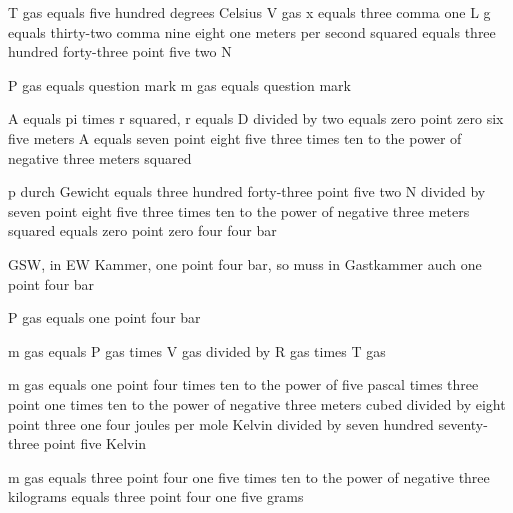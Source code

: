 T gas equals five hundred degrees Celsius  
V gas x equals three comma one L  
g equals thirty-two comma nine eight one meters per second squared equals three hundred forty-three point five two N  

P gas equals question mark  
m gas equals question mark  

A equals pi times r squared, r equals D divided by two equals zero point zero six five meters  
A equals seven point eight five three times ten to the power of negative three meters squared  

p durch Gewicht equals three hundred forty-three point five two N divided by seven point eight five three times ten to the power of negative three meters squared equals zero point zero four four bar  

GSW, in EW Kammer, one point four bar, so muss in Gastkammer auch one point four bar  

P gas equals one point four bar  

m gas equals P gas times V gas divided by R gas times T gas  

m gas equals one point four times ten to the power of five pascal times three point one times ten to the power of negative three meters cubed divided by eight point three one four joules per mole Kelvin divided by seven hundred seventy-three point five Kelvin  

m gas equals three point four one five times ten to the power of negative three kilograms equals three point four one five grams